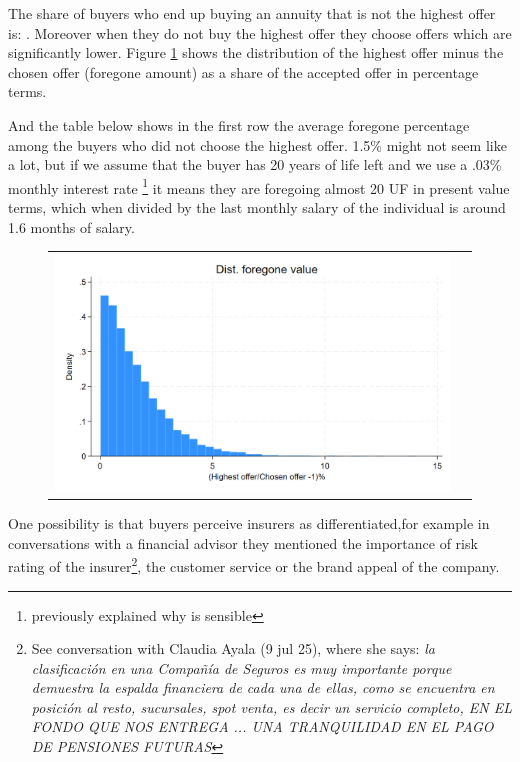 \documentclass[12pt]{article}
\begin{document}
The share of buyers who end up buying an annuity that is not the highest offer is: . Moreover when they do not buy the highest offer they choose offers which are significantly lower. Figure \ref{fig:ie3_7} shows the distribution of the highest offer minus the chosen offer (foregone amount) as a share of the accepted offer in percentage terms.

And the table below shows in the first row the average foregone percentage among the buyers who did not choose the highest offer. 1.5\% might not seem like a lot, but if we assume that the buyer has 20 years of life left and we use a .03\% monthly interest rate  \footnote{previously explained why is sensible} it means they are foregoing almost 20 UF in present value terms, which when divided by the last monthly salary of the individual is around 1.6 months of salary. 


\begin{figure}[H]
\caption{}
\label{fig:ie3_7}
\centering{}%
\begin{tabular}{cc}
\includegraphics[scale=0.27]{../figures/IE3_foregone_hist.png}
\end{tabular}
\end{figure}



One possibility is that buyers perceive insurers as differentiated,for example in conversations with a financial advisor they mentioned the importance of risk rating of the insurer\footnote{See conversation with Claudia Ayala (9 jul 25), where she says: \textit{ la clasificación en una Compañía de Seguros es muy importante porque demuestra la espalda financiera de cada una de ellas, como se encuentra en posición al resto, sucursales, spot venta, es decir un servicio completo, EN EL FONDO QUE NOS ENTREGA ... UNA TRANQUILIDAD EN EL PAGO DE PENSIONES FUTURAS}}, the customer service or the brand appeal of the company. 
\end{document}
